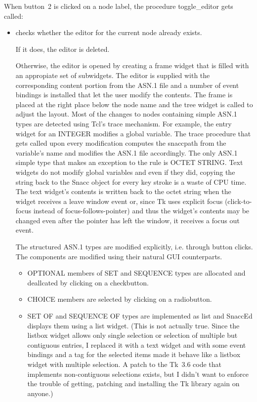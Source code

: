 When button~2 is clicked on a node label, the procedure {\Tcl toggle\_editor} gets called:
\begin{itemize}
  \item
    checks whether the editor for the current node already exists.

    If it does, the editor is deleted.

    Otherwise, the editor is opened by creating a frame widget that is filled with an appropiate set of subwidgets.
    The editor is supplied with the corresponding content portion from the ASN.1 file and a number of event bindings is installed that let the user modify the contents.
    The frame is placed at the right place below the node name and the tree widget is called to adjust the layout.
    Most of the changes to nodes containing simple ASN.1 types are detected using Tcl's trace mechanism.
    For example, the entry widget for an INTEGER modifies a global variable.
    The trace procedure that gets called upon every modification computes the snaccpath from the variable's name and modifies the ASN.1 file accordingly.
    The only ASN.1 simple type that makes an exception to the rule is OCTET STRING.
    Text widgets do not modify global variables and even if they did, copying the string back to the Snacc object for every key stroke is a waste of CPU time.
    The text widget's contents is written back to the octet string when the widget receives a leave window event or, since Tk uses explicit focus (click-to-focus instead of focus-follows-pointer) and thus the widget's contents may be changed even after the pointer has left the window, it receives a focus out event.

    The structured ASN.1 types are modified explicitly, i.e. through button clicks.
    The components are modified using their natural GUI counterparts.
    \begin{itemize}
      \item OPTIONAL members of SET and SEQUENCE types are allocated and deallcated by clicking on a checkbutton.
      \item CHOICE members are selected by clicking on a radiobutton.
      \item SET OF and SEQUENCE OF types are implemented as list and SnaccEd displays them using a list widget.
	(This is not actually true.
	Since the listbox widget allows only single selection or selection of multiple but contiguous entries, I replaced it with a text widget and with some event bindings and a tag for the selected items made it behave like a listbox widget with multiple selection.
	A patch to the Tk~3.6 code that implements non-contiguous selections exists, but I didn't want to enforce the trouble of getting, patching and installing the Tk library again on anyone.)
    \end{itemize}
\end{itemize}


